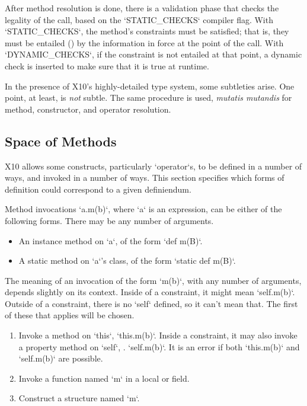 After method resolution is done, there is a validation phase that checks the
legality of the call, based on the \xcd`STATIC_CHECKS` compiler flag.  
With \xcd`STATIC_CHECKS`, the method's constraints must be satisfied; that is,
they must be entailed () by the information in
force at the point of the call.  With \xcd`DYNAMIC_CHECKS`, if the constraint
is not entailed at that point, a dynamic check is inserted to make sure that
it is true at runtime.

\noindent
In the presence of X10's highly-detailed type system, some subtleties arise. 
One point, at least, is {\em not} subtle. The same procedure is used, {\em
mutatis mutandis} for method, constructor, and operator resolution.  



\subsection{Space of Methods}

X10 allows some constructs, particularly \xcd`operator`s, to be defined in a
number of ways, and invoked in a number of ways. This section specifies which
forms of definition could correspond to a given definiendum.

Method invocations \xcd`a.m(b)`, where \xcd`a` is an expression, can be either
of the following forms.  There may be any number of arguments.
\begin{itemize}
\item An instance method on \xcd`a`, of the form \xcd`def m(B)`.
\item A static method on \xcd`a`'s class, of the form \xcd`static def m(B)`.
\end{itemize}

The meaning of an invocation of the form \xcd`m(b)`, with any number of
arguments, depends slightly on its context.  Inside of a constraint, it might
mean \xcd`self.m(b)`.  Outside of a constraint, there is no \xcd`self`
defined, so it can't mean that.  The first of these that applies will be
chosen. 
\begin{enumerate}
\item Invoke a method on \xcd`this`, \viz{} \xcd`this.m(b)`.  Inside a
      constraint, it may also invoke a property method on \xcd`self`, \viz.
      \xcd`self.m(b)`.  It is an error if both \xcd`this.m(b)` and
      \xcd`self.m(b)` are possible.
\item Invoke a function named \xcd`m` in a local or field.
\item Construct a structure named \xcd`m`.
\end{enumerate}

